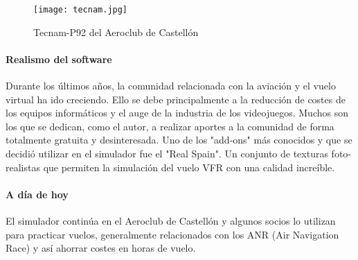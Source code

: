 \begin{wrapfigure}{r}{0.5\linewidth}
	\centering
	\texttt{[image: tecnam.jpg]}
	\caption*{Tecnam-P92 del Aeroclub de Castellón}
	\label{labelformat=empty}
\end{wrapfigure}

\paragraph{Realismo del software}
Durante los últimos años, la comunidad relacionada con la aviación y el vuelo virtual ha ido creciendo. Ello se debe principalmente a la reducción de costes de los equipos informáticos y el auge de la industria de los videojuegos. Muchos son los que se dedican, como el autor, a realizar aportes a la comunidad de forma totalmente gratuita y desinteresada. Uno de los "add-ons" más conocidos y que se decidió utilizar en el simulador fue el "Real Spain". Un conjunto de texturas foto-realistas que permiten la simulación del vuelo VFR con una calidad increíble.

\paragraph{A día de hoy} El simulador continúa en el Aeroclub de Castellón y algunos socios lo utilizan para practicar vuelos, generalmente relacionados con los ANR (Air Navigation Race) y así ahorrar costes en horas de vuelo.



